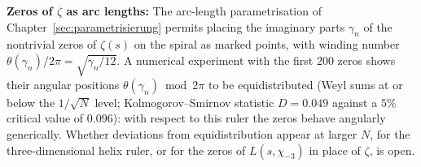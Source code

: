 \item \textbf{Zeros of $\zeta$ as arc lengths:}
  The arc-length parametrisation of Chapter~\ref{sec:parametrisierung}
  permits placing the imaginary parts $\gamma_n$ of the nontrivial
  zeros of $\zeta(s)$ on the spiral as marked points, with winding
  number $\theta(\gamma_n)/2\pi = \sqrt{\gamma_n/12}$. A numerical
  experiment with the first $200$ zeros shows their angular positions
  $\theta(\gamma_n) \bmod 2\pi$ to be equidistributed (Weyl sums at or
  below the $1/\sqrt{N}$ level; Kolmogorov--Smirnov statistic
  $D = 0.049$ against a $5\%$ critical value of $0.096$): with respect
  to this ruler the zeros behave angularly generically. Whether
  deviations from equidistribution appear at larger $N$, for the
  three-dimensional helix ruler, or for the zeros of $L(s,\chi_{-3})$
  in place of $\zeta$, is open.

